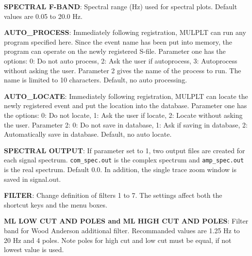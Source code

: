 \textbf{SPECTRAL F-BAND}: Spectral range (Hz) used for spectral plots. Default values are 0.05 to 20.0 Hz. 

\textbf{AUTO\_PROCESS}: Immediately following registration, MULPLT can run any program specified here. Since the event name has been put into memory, the program can operate on the newly registered S-file. Parameter one has the options: 0: Do not auto process, 2: Ask the user if autoprocess, 3: Autoprocess without asking the user. Parameter 2 gives the name of the process to run. The name is limited to 10 characters. Default, no auto processing. 

\textbf{AUTO\_LOCATE}: Immediately following registration, MULPLT can locate the newly registered event and put the location into the database. Parameter one has the options: 0: Do not locate, 1: Ask the user if locate, 2: Locate without asking the user. Parameter 2: 0: Do not save in database, 1: Ask if saving in database, 2: Automatically save in database. Default, no auto locate. 

\textbf{SPECTRAL OUTPUT}: If parameter set to 1, two output files are created for each signal spectrum. \texttt{com\_spec.out} is the complex spectrum and \texttt{amp\_spec.out} is the real spectrum. Default 0.0. In addition, the single trace zoom window is saved in signal.out. 

\textbf{FILTER}: Change definition of filters 1 to 7. The settings affect both the shortcut keys and the menu boxes. 


\textbf{ML LOW CUT AND POLES and ML HIGH CUT AND POLES}: 
Filter band for Wood Anderson 
additional 
filter. Recommanded values are 1.25 Hz to 20 Hz and 4 poles. Note poles for high cut and low cut must be equal, if not lowest value is used. 

